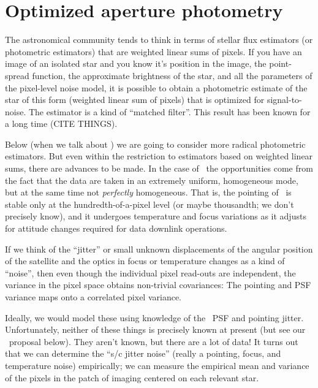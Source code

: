 \documentclass[letterpaper,12pt,preprint]{hack_aastex}
\begin{document}
\section{Optimized aperture photometry}

The astronomical community tends to think in terms of stellar flux estimators
(or photometric estimators) that are weighted linear sums of pixels.
If you have an image of an isolated star and you know it's position in the
image, the point-spread function, the approximate brightness of the star, and
all the parameters of the pixel-level noise model, it is possible to obtain a
photometric estimate of the star of this form (weighted linear sum of pixels)
that is optimized for signal-to-noise.
The estimator is a kind of ``matched filter''.
This result has been known for a long time (CITE THINGS).

Below (when we talk about \kpsf) we are going to consider more radical
photometric estimators.
But even within the restriction to estimators based on weighted linear sums,
there are advances to be made.
In the case of \Kepler\ the opportunities come from the fact that the data
are taken in an extremely uniform, homogeneous mode, but at the same time not
\emph{perfectly} homogeneous.
That is, the pointing of \Kepler\ is stable only at the hundredth-of-a-pixel
level (or maybe thousandth; we don't precisely know), and it undergoes
temperature and focus variations as it adjusts for attitude changes required
for data downlink operations.

If we think of the ``jitter'' or small unknown displacements of the angular
position of the satellite and the optics in focus or temperature changes as a
kind of ``noise'', then even though the individual pixel read-outs are
independent, the variance in the pixel space obtains non-trivial covariances:
The pointing and PSF variance maps onto a correlated pixel variance.

Ideally, we would model these using knowledge of the \Kepler\ PSF and
pointing jitter.
Unfortunately, neither of these things is precisely known at present (but see
our \kpsf\ proposal below).
They aren't known, but there are a lot of data!
It turns out that we can determine the ``s/c jitter noise'' (really a pointing,
focus, and temperature noise) empirically;
we can measure the empirical mean and variance of the pixels in the patch of
imaging centered on each relevant star.
\end{document}
